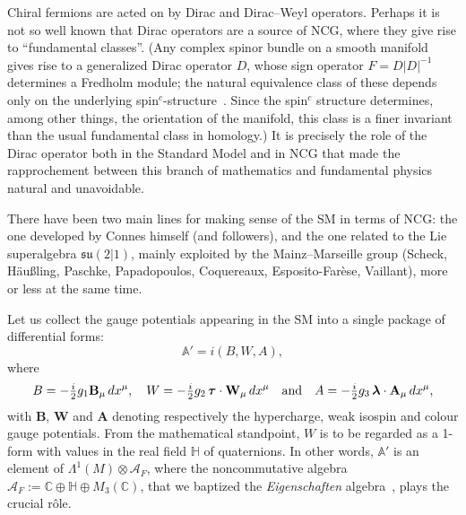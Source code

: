 \documentclass[a4paper,12pt]{article}
\newcommand{\A}{\mathcal{A}}        %
\renewcommand{\AA}{\mathbb{A}}      %
\newcommand{\C}{\mathbb{C}}         %
\newcommand{\HH}{\mathbb{H}}        %
\newcommand{\La}{\Lambda}           %
\newcommand{\lab}{\boldsymbol{\lambda}} %
\newcommand{\ox}{\otimes}           %
\newcommand{\sul}{\mathfrak{su}}    %
\newcommand{\taub}{\boldsymbol{\tau}} %
\newcommand{\tihalf}{\tfrac{i}{2}}  %
\newcommand{\1}{\mathbf{1}}         %
\newcommand{\7}{\dagger}            %
\newcommand{\8}{\bullet}            %
\renewcommand{\.}{\cdot}            %
\renewcommand{\:}{\colon}           %
\begin{document}
Chiral fermions are acted on by Dirac and Dirac--Weyl operators.
Perhaps it is not so well known that Dirac operators are a source of
NCG, where they give rise to ``fundamental classes''. (Any complex
spinor bundle on a smooth manifold gives rise to a generalized Dirac
operator $D$, whose sign operator $F = D|D|^{-1}$ determines a
Fredholm module; the natural equivalence class of these depends only
on the underlying spin$^c$-structure~\cite{HigsonR}. Since the
spin$^c$ structure determines, among other things, the orientation of
the manifold, this class is a finer invariant than the usual
fundamental class in homology.) It is precisely the role of the Dirac
operator both in the Standard Model and in NCG that made the
rapprochement between this branch of mathematics and fundamental
physics natural and unavoidable.

There have been two main lines for making sense of the SM in terms of
NCG: the one developed by Connes himself (and followers), and the one
related to the Lie superalgebra $\sul(2|1)$, mainly exploited by the
Mainz--Marseille group (Scheck, H\"au{\ss}ling, Paschke, Papadopoulos,
Coquereaux, Esposito-Far\`ese, Vaillant), more or less at the
same time.

Let us collect the gauge potentials appearing in the SM into a single
package of differential forms:
$$
\AA' = i(B,W,A),
$$
where
$$
B = -\tihalf g_1 \mathbf{B}_\mu \,dx^\mu, \quad
W = -\tihalf g_2\,\taub \cdot \mathbf{W}_\mu \,dx^\mu
\quad{\rm and}
\quad A = -\tihalf g_3\,\lab \cdot \mathbf{A}_\mu\,dx^\mu,
$$
with $\mathbf{B}$, $\mathbf{W}$ and $\mathbf{A}$ denoting respectively
the hypercharge, weak isospin and colour gauge potentials. From the
mathematical standpoint, $W$ is to be regarded as a 1-form with values
in the real field $\HH$ of quaternions. In other words, $\AA'$ is an
element of $\La^1(M) \ox \A_F$, where the noncommutative algebra
$\A_F := \C \oplus \HH \oplus M_3(\C)$, that we baptized the 
\textit{Eigenschaften\/} algebra~\cite{Cordelia}, plays the crucial
r\^ole.
\end{document}
